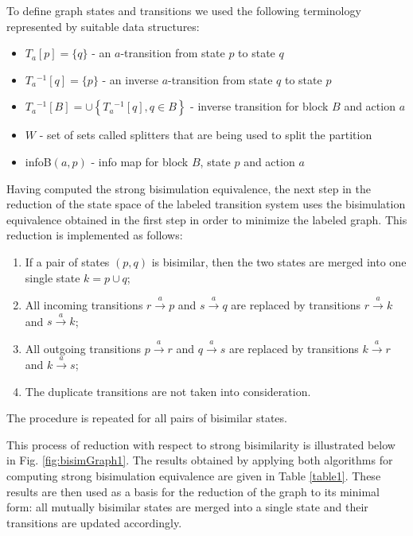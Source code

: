To define graph states and transitions we used the following terminology represented by suitable data structures: 
\begin{itemize}
	\item $T_a[p]=\{q\}$ - an $a$-transition from state $p$ to state $q$
	\item $T_a{}^{-1}[q]=\{p\}$ - an inverse $a$-transition from state $q$ to state $p$
	\item $T_a{}^{-1}[B]=\cup \left\{T_a{}^{-1}[q],q\in B\right\}$ - inverse transition for block $B$ and action $a$
	\item $W$ - set of sets called splitters that are being used to split the partition
	\item infoB$(a, p)$ - info map for block $B$, state $p$ and action $a$
\end{itemize}

Having computed the strong bisimulation equivalence, the next step in the reduction of the state space of the labeled transition system uses the bisimulation equivalence obtained in the first step in order to minimize the labeled graph. This reduction is implemented as follows:
\begin{enumerate}
	\item If a pair of states $(p, q)$ is bisimilar, then the two states are merged into one single state $k=p\cup q$;
	\item All incoming transitions $r \stackrel{a}{\rightarrow} p$ and $s \stackrel{a}{\rightarrow} q$ are replaced by transitions $r \stackrel{a}{\rightarrow} k$ and $s \stackrel{a}{\rightarrow} k$;
	\item All outgoing transitions $p \stackrel{a}{\rightarrow} r$ and $q \stackrel{a}{\rightarrow} s$ are replaced by transitions $k \stackrel{a}{\rightarrow} r$ and $k \stackrel{a}{\rightarrow} s$;
	\item The duplicate transitions are not taken into consideration.
\end{enumerate}
The procedure is repeated for all pairs of bisimilar states.

This process of reduction with respect to strong bisimilarity is illustrated below in Fig. \ref{fig:bisimGraph1}. The results obtained by applying both algorithms for computing strong bisimulation equivalence are given in Table \ref{table1}. These results are then used as a basis for the reduction of the graph to its minimal form: all mutually bisimilar states are merged into a single state and their transitions are updated accordingly. 

